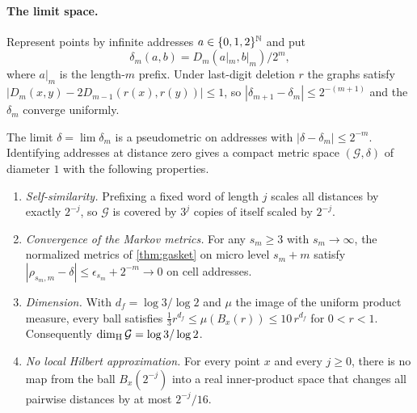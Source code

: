 \paragraph{The limit space.}
Represent points by infinite addresses $a\in\{0,1,2\}^{\mathbb{N}}$ and put
\[
\delta_m(a,b)=D_m(a|_m,b|_m)/2^m,
\]
where $a|_m$ is the length-$m$ prefix.
Under last-digit deletion $r$ the graphs satisfy $|D_m(x,y)-2D_{m-1}(r(x),r(y))|\le1$, so $|\delta_{m+1}-\delta_m|\le2^{-(m+1)}$ and the $\delta_m$ converge uniformly.

\begin{theorem}
\label{thm:gasket-limit}
The limit $\delta=\lim\delta_m$ is a pseudometric on addresses with $|\delta-\delta_m|\le2^{-m}$. Identifying addresses at distance zero gives a compact metric space $(\mathcal G,\delta)$ of diameter $1$ with the following properties.
\begin{enumerate}[label=(\roman*)]
\item \emph{Self-similarity.} Prefixing a fixed word of length $j$ scales all distances by exactly $2^{-j}$, so $\mathcal G$ is covered by $3^j$ copies of itself scaled by $2^{-j}$.
\item \emph{Convergence of the Markov metrics.} For any $s_m\ge3$ with $s_m\to\infty$, the normalized metrics of \cref{thm:gasket} on micro level $s_m+m$ satisfy $|\rho_{s_m,m}-\delta|\le\epsilon_{s_m}+2^{-m}\to0$ on cell addresses.
\item \emph{Dimension.} With $d_f=\log3/\log2$ and $\mu$ the image of the uniform product measure, every ball satisfies $\tfrac13 r^{d_f}\le\mu(B_x(r))\le10\,r^{d_f}$ for $0<r<1$. Consequently $\dim_{\mathrm{H}}\mathcal G=\log 3/\log 2$.
\item \emph{No local Hilbert approximation.} For every point $x$ and every $j\ge0$, there is no map from the ball $B_x(2^{-j})$ into a real inner-product space that changes all pairwise distances by at most $2^{-j}/16$.
\end{enumerate}
\end{theorem}



